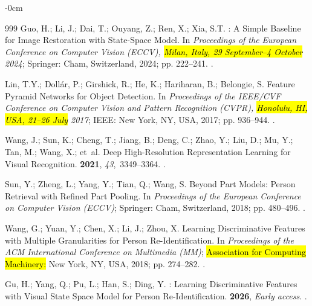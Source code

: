 \documentclass[symmetry,article,accept,pdftex,moreauthors]{Definitions/mdpi}
\begin{document}
\begin{adjustwidth}{-\extralength}{0cm}
\begin{thebibliography}{999}
Guo, H.; Li, J.; Dai, T.; Ouyang, Z.; Ren, X.; Xia, S.T.
: A Simple Baseline for Image Restoration with State-Space
  Model.
\newblock In \emph{Proceedings of the European Conference on Computer Vision (ECCV), \hl{Milan, Italy,  29 September--4 October}  2024}; Springer: Cham, Switzerland, 2024; pp. 222--241.
 .

Lin, T.Y.; Doll{\'a}r, P.; Girshick, R.; He, K.; Hariharan, B.; Belongie, S.
\newblock Feature Pyramid Networks for Object Detection.
\newblock In \emph{Proceedings of the IEEE/CVF Conference on Computer Vision and
  Pattern Recognition (CVPR), \hl{Honolulu, HI, USA, 21--26 July} 2017}; IEEE: New York, NY, USA,  2017; pp. 936--944.
.

Wang, J.; Sun, K.; Cheng, T.; Jiang, B.; Deng, C.; Zhao, Y.; Liu, D.; Mu, Y.;
  Tan, M.; Wang, X.;  et~al.
\newblock Deep High-Resolution Representation Learning for Visual Recognition.
  {\bf 2021}, {\em 43},~3349--3364.
.

Sun, Y.; Zheng, L.; Yang, Y.; Tian, Q.; Wang, S.
\newblock Beyond Part Models: Person Retrieval with Refined Part Pooling.
\newblock In \emph{Proceedings of the European Conference on Computer Vision (ECCV)};
  Springer: Cham, Switzerland,  2018; pp. 480--496.
.

Wang, G.; Yuan, Y.; Chen, X.; Li, J.; Zhou, X.
\newblock Learning Discriminative Features with Multiple Granularities for
  Person Re-Identification.
\newblock In \emph{Proceedings of the ACM International Conference on Multimedia
  (MM)}; \hl{Association for Computing Machinery:} New York, NY, USA,  2018; pp. 274--282.
.

Gu, H.; Yang, Q.; Pu, L.; Han, S.; Ding, Y.
: Learning Discriminative Features with Visual State Space
  Model for Person Re-Identification.
 {\bf 2026}, \emph{Early access}.
 .


\end{thebibliography}
\end{adjustwidth}
\end{document}
